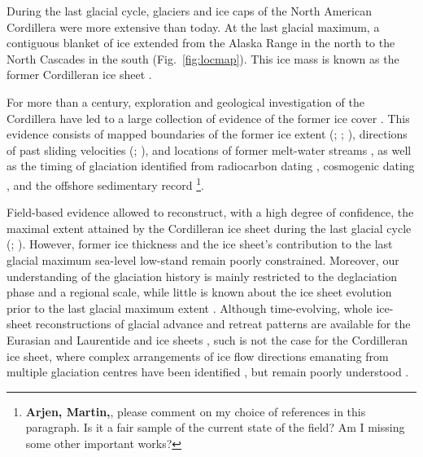 \documentclass[tc, manuscript]{copernicus}
\begin{document}
\introduction
\label{sec:intro}

During the last glacial cycle, glaciers and ice caps of the North American
Cordillera were more extensive than today. At the last glacial maximum, a
contiguous blanket of ice extended from the Alaska Range in the north to the
North Cascades in the south (Fig.~\ref{fig:locmap}). This ice mass is known as
the former Cordilleran ice sheet \citep{Dawson.1888}.

For more than a century, exploration and geological investigation of the
Cordillera have led to a large collection of evidence of the former ice cover
\citep{Jackson.Clague.1991}. This evidence consists of mapped boundaries of the
former ice extent (\citealp[Fig.~1.12]{Clague.1989}; \citealp{Duk-Rodkin.1999};
\citealp{Dyke.2004}), directions of past sliding velocities
(\citealp{Prest.etal.1968}; \citealp[Fig.~2]{Kleman.etal.2010}), and locations
of former
melt-water streams \citep{Margold.etal.2011, Margold.etal.2013}, as well as the
timing of glaciation identified from radiocarbon dating \citep[e.g.,][]
{Clague.1981, Porter.Swanson.1998}, cosmogenic dating \citep[e.g.,][]
{Ward.etal.2007, Menounos.etal.2009, Stroeven.etal.2010, Stroeven.etal.2013},
and the offshore sedimentary record \citep{Cosma.etal.2008, Davies.etal.2011}%
\footnote{\textbf{Arjen, Martin,}, please comment on my choice of references
    in this paragraph. Is it a fair sample of the current state of the field?
    Am I missing some other important works?}.

Field-based evidence allowed to reconstruct, with a high degree of confidence,
the maximal extent attained by the Cordilleran ice sheet during the last
glacial cycle (\citealp[Fig. 1.12]{Clague.1989}; \citealp{Dyke.2004}). However,
former ice thickness
and the ice sheet's contribution to the last glacial maximum sea-level
low-stand remain poorly constrained. Moreover, our understanding of the
glaciation history is mainly restricted to the deglaciation phase and a
regional scale, while little is known about the ice sheet evolution prior to
the last glacial maximum extent \citep[Fig.~6]{Kleman.etal.2010}. Although
time-evolving, whole ice-sheet reconstructions of glacial advance and retreat
patterns are available for the Eurasian and Laurentide and ice sheets
\citep{Kleman.etal.1997, Kleman.etal.2010}, such is not the case for the
Cordilleran ice sheet, where complex arrangements of ice flow directions
emanating from multiple glaciation centres have been identified
\citep[Fig.~1.12]{Prest.etal.1968, Clague.1989}, but remain poorly understood
\citep[p.~2049]{Kleman.etal.2010}.
\end{document}
